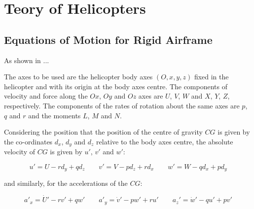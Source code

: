\section{Teory of Helicopters}

\subsection{Equations of Motion for Rigid Airframe}

As shown in \cite{Cooke}...

The axes to be used are the helicopter body axes $(O,x,y,z)$ fixed in the helicopter and with its origin at the body axes centre. The components of velocity and force along the $Ox$, $Oy$ and $Oz$ axes are $U$, $V$, $W$ and $X$, $Y$, $Z$, respectively. The components of the rates of rotation about the same axes are $p$, $q$ and $r$ and the moments $L$, $M$ and $N$.

Considering the position that the position of the centre of gravity $CG$ is given by the co-ordinates $d_x$, $d_y$ and $d_z$ relative to the body axes centre, the absolute velocity of $CG$ is given by $u'$, $v'$ and $w'$:

\begin{equation}
	u' = U - r d_y + q d_z \qquad v' = V - p d_z + r d_x \qquad w' = W - q d_x + p d_y
\end{equation}

\noindent
and similarly, for the accelerations of the $CG$:

\begin{equation}
	a'_x = \dot{U}' - r v' + q w' \qquad a'_y = \dot{v}' - p w' + r u' \qquad a_z' = \dot{w}' - q u' + p v'
\end{equation}